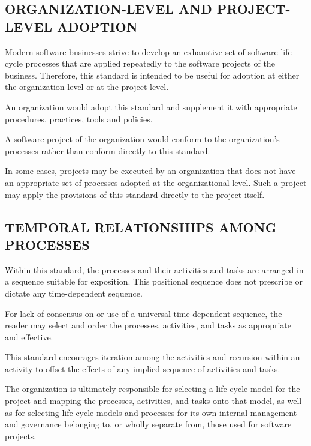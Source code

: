 	\subsection{ORGANIZATION-LEVEL AND PROJECT-LEVEL ADOPTION}
	\begin{adjustwidth}{0.5em}{0pt}

		Modern software businesses strive to develop an exhaustive set of software life cycle processes that are applied repeatedly to the software projects of the business. Therefore, this standard is intended to be useful for adoption at either the organization level or at the project level. 

		An organization would adopt this standard and supplement it with appropriate procedures, practices, tools and policies. 

		A software project of the organization would conform to the organization's processes rather than conform directly to this standard. 

		In some cases, projects may be executed by an organization that does not have an appropriate set of processes adopted at the organizational level. Such a project may apply the provisions of this standard directly to the project itself.

	\end{adjustwidth}

	\subsection{TEMPORAL RELATIONSHIPS AMONG PROCESSES}
	\begin{adjustwidth}{0.5em}{0pt}

		Within this standard, the processes and their activities and tasks are arranged in a sequence suitable for exposition. This positional sequence does not prescribe or dictate any time-dependent sequence. 

		For lack of consensus on or use of a universal time-dependent sequence, the reader may select and order the processes, activities, and tasks as appropriate and effective. 

		This standard encourages iteration among the activities and recursion within an activity to offset the effects of any implied sequence of activities and tasks. 

		The organization is ultimately responsible for selecting a life cycle model for the project and mapping the processes, activities, and tasks onto that model, as well as for selecting life cycle models and processes for its own internal management and governance belonging to, or wholly separate from, those used for software projects. 

	\end{adjustwidth}


